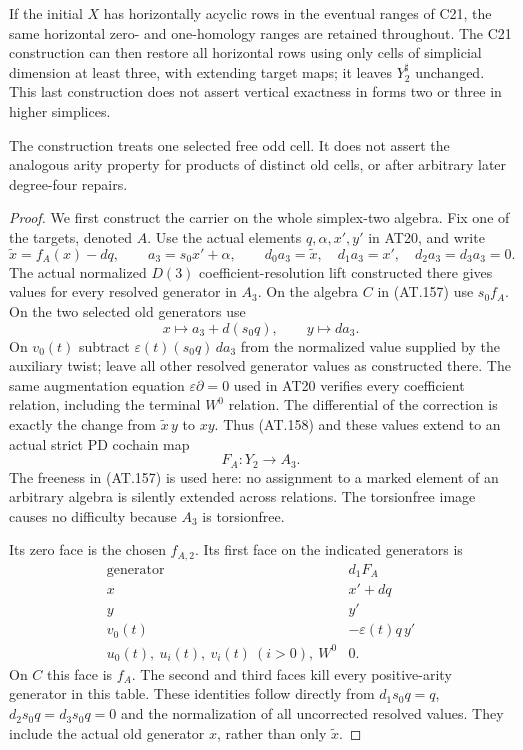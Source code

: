 \begin{theorem}
If the initial $X$ has horizontally acyclic rows in
the eventual ranges of C21, the same horizontal
zero- and one-homology ranges are retained throughout.
The C21 construction can then restore all horizontal
rows using only cells of simplicial dimension at least
three, with extending target maps; it leaves
$Y^\sharp_2$ unchanged.
This last construction does not assert vertical
exactness in forms two or three in higher simplices.

The construction treats one selected free odd cell.
It does not assert the analogous arity property for
products of distinct old cells, or after arbitrary
later degree-four repairs.
\end{theorem}

\begin{proof}
We first construct the carrier on the whole
simplex-two algebra. Fix one of the targets, denoted
$A$. Use the actual elements $q,\alpha,x',y'$ in
AT20, and write
\[
 \widetilde x=f_A(x)-dq,\qquad
 a_3=s_0x'+\alpha,\qquad
 d_0a_3=\widetilde x,\quad d_1a_3=x',
 \quad d_2a_3=d_3a_3=0.
\]
The actual normalized $D(3)$ coefficient-resolution
lift constructed there gives values for every
resolved generator in $A_3$.
On the algebra $C$ in (AT.157) use $s_0f_A$.
On the two selected old generators use
\[
 x\longmapsto a_3+d(s_0q),\qquad
 y\longmapsto da_3.
 \tag{AT.158}
\]
On $v_0(t)$ subtract
$\varepsilon(t)(s_0q)\,da_3$ from the normalized
value supplied by the auxiliary twist; leave all
other resolved generator values as constructed there.
The same augmentation equation
$\varepsilon\partial=0$ used in AT20 verifies every
coefficient relation, including the terminal
$W^0$ relation. The differential of the correction is
exactly the change from $\widetilde x\,y$ to $xy$.
Thus (AT.158) and these values extend to an actual
strict PD cochain map
\[
                  F_A:Y_2\longrightarrow A_3.
 \tag{AT.159}
\]
The freeness in (AT.157) is used here: no assignment
to a marked element of an arbitrary algebra is
silently extended across relations.
The torsionfree image causes no difficulty because
$A_3$ is torsionfree.

Its zero face is the chosen $f_{A,2}$.
Its first face on the indicated generators is
\[
 \begin{array}{c|c}
  \text{generator}&d_1F_A\\ \hline
  x&x'+dq\\
  y&y'\\
  v_0(t)&-\varepsilon(t)q\,y'\\
  u_0(t),\ u_i(t),\ v_i(t)\ (i>0),\ W^0&0 .
 \end{array}
 \tag{AT.160}
\]
On $C$ this face is $f_A$.
The second and third faces kill every positive-arity
generator in this table.
These identities follow directly from
$d_1s_0q=q$, $d_2s_0q=d_3s_0q=0$ and the
normalization of all uncorrected resolved values.
They include the actual old generator $x$, rather
than only $\widetilde x$.


\end{proof}
